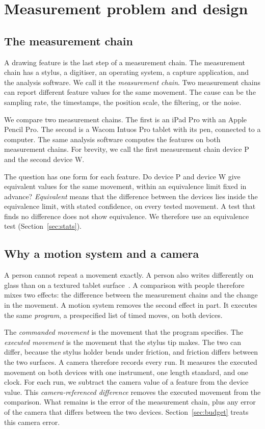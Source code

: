 \section{Measurement problem and design}
\label{sec:design}

\subsection{The measurement chain}
A drawing feature is the last step of a measurement chain.
The measurement chain has a stylus, a digitiser, an operating system, a capture application, and the analysis software.
We call it the \emph{measurement chain}.
Two measurement chains can report different feature values for the same movement.
The cause can be the sampling rate, the timestamps, the position scale, the filtering, or the noise.

We compare two measurement chains.
The first is an iPad Pro with an Apple Pencil Pro.
The second is a Wacom Intuos Pro tablet with its pen, connected to a computer.
The same analysis software computes the features on both measurement chains.
For brevity, we call the first measurement chain device P and the second device W.

The question has one form for each feature.
Do device P and device W give equivalent values for the same movement, within an equivalence limit fixed in advance?
\emph{Equivalent} means that the difference between the devices lies inside the equivalence limit, with stated confidence, on every tested movement.
A test that finds no difference does not show equivalence.
We therefore use an equivalence test (Section~\ref{sec:stats}).

\subsection{Why a motion system and a camera}
A person cannot repeat a movement exactly.
A person also writes differently on glass than on a textured tablet surface~\cite{Gerth2016b,Alamargot2015}.
A comparison with people therefore mixes two effects: the difference between the measurement chains and the change in the movement.
A motion system removes the second effect in part.
It executes the same \emph{program}, a prespecified list of timed moves, on both devices.

The \emph{commanded movement} is the movement that the program specifies.
The \emph{executed movement} is the movement that the stylus tip makes.
The two can differ, because the stylus holder bends under friction, and friction differs between the two surfaces.
A camera therefore records every run.
It measures the executed movement on both devices with one instrument, one length standard, and one clock.
For each run, we subtract the camera value of a feature from the device value.
This \emph{camera-referenced difference} removes the executed movement from the comparison.
What remains is the error of the measurement chain, plus any error of the camera that differs between the two devices.
Section~\ref{sec:budget} treats this camera error.


